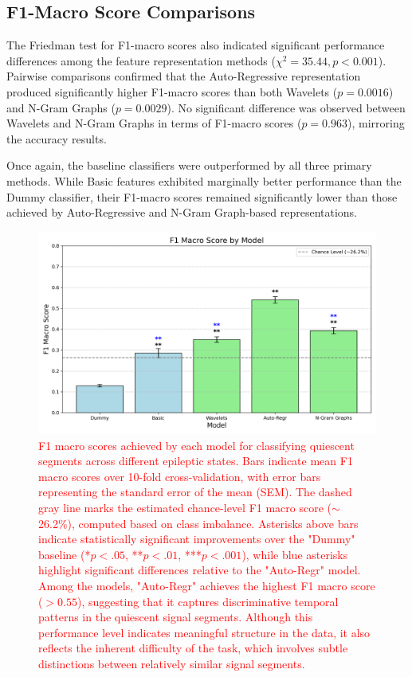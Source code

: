 \documentclass{article}
\begin{document}
\subsection*{F1-Macro Score Comparisons}
The Friedman test for F1-macro scores also indicated significant performance differences among the feature representation methods (\(
\chi^2 = 35.44, p < 0.001
\)).
Pairwise comparisons confirmed that the Auto-Regressive representation produced significantly higher F1-macro scores than both Wavelets (\(
p = 0.0016
\))
and N-Gram Graphs (\(
p = 0.0029
\)).
No significant difference was observed between Wavelets and N-Gram Graphs in terms of F1-macro scores (\(
p = 0.963
\)),
mirroring the accuracy results.

Once again, the baseline classifiers were outperformed by all three primary methods. While Basic features exhibited marginally better performance than the Dummy classifier, their F1-macro scores remained significantly lower than those achieved by Auto-Regressive and N-Gram Graph-based representations.

\begin{figure}[htbp]
	\centering
	\includegraphics[width=\linewidth]{barplot_f1_macro.png}
	\caption{%
		\textcolor{red}{F1 macro scores achieved by each model for classifying quiescent segments across different epileptic states. Bars indicate mean F1 macro scores over 10-fold cross-validation, with error bars representing the standard error of the mean (SEM). The dashed gray line marks the estimated chance-level F1 macro score ($\sim$26.2\%), computed based on class imbalance. Asterisks above bars indicate statistically significant improvements over the "Dummy" baseline (*$p < .05$, **$p < .01$, ***$p < .001$), while blue asterisks highlight significant differences relative to the "Auto-Regr" model. Among the models, "Auto-Regr" achieves the highest F1 macro score ($>0.55$), suggesting that it captures discriminative temporal patterns in the quiescent signal segments. Although this performance level indicates meaningful structure in the data, it also reflects the inherent difficulty of the task, which involves subtle distinctions between relatively similar signal segments.}%
	}
	\label{fig:f1macro}
	\end{figure}
\end{document}
